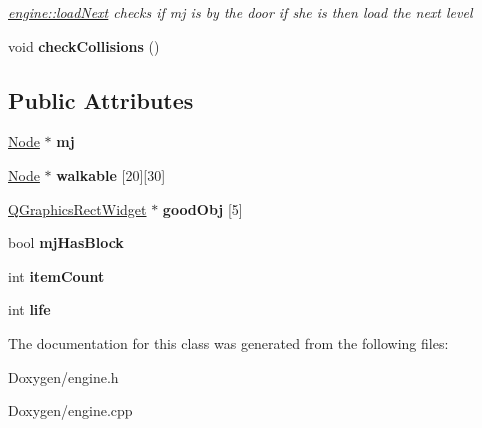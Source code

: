 \begin{DoxyCompactItemize}
\begin{DoxyCompactList}\small\item\em \hyperlink{classengine_a56c6f2331fa2045f184b183c89f9c199}{engine\-::load\-Next} checks if mj is by the door if she is then load the next level \end{DoxyCompactList}\item 
\hypertarget{classengine_a1fa4f5009e031570cd0e40d7056c8a61}{void {\bfseries check\-Collisions} ()}\label{classengine_a1fa4f5009e031570cd0e40d7056c8a61}

\end{DoxyCompactItemize}
\subsection*{Public Attributes}
\begin{DoxyCompactItemize}
\item 
\hypertarget{classengine_ab3a51856b749c44d32f45ab4ba653d59}{\hyperlink{class_node}{Node} $\ast$ {\bfseries mj}}\label{classengine_ab3a51856b749c44d32f45ab4ba653d59}

\item 
\hypertarget{classengine_ab994ab325c0c9fa80dea14e935f20d83}{\hyperlink{class_node}{Node} $\ast$ {\bfseries walkable} \mbox{[}20\mbox{]}\mbox{[}30\mbox{]}}\label{classengine_ab994ab325c0c9fa80dea14e935f20d83}

\item 
\hypertarget{classengine_a3f98c76f5a03777bd0e0543dae1c9725}{\hyperlink{class_q_graphics_rect_widget}{Q\-Graphics\-Rect\-Widget} $\ast$ {\bfseries good\-Obj} \mbox{[}5\mbox{]}}\label{classengine_a3f98c76f5a03777bd0e0543dae1c9725}

\item 
\hypertarget{classengine_a66bf076777496c5588df19a7191bbdb4}{bool {\bfseries mj\-Has\-Block}}\label{classengine_a66bf076777496c5588df19a7191bbdb4}

\item 
\hypertarget{classengine_a4a40819a98ac7ab07ce6669a291adfaf}{int {\bfseries item\-Count}}\label{classengine_a4a40819a98ac7ab07ce6669a291adfaf}

\item 
\hypertarget{classengine_a03e0b46f80c31f67235837a8cbb9ee27}{int {\bfseries life}}\label{classengine_a03e0b46f80c31f67235837a8cbb9ee27}

\end{DoxyCompactItemize}


The documentation for this class was generated from the following files\-:\begin{DoxyCompactItemize}
\item 
Doxygen/engine.\-h\item 
Doxygen/engine.\-cpp\end{DoxyCompactItemize}
